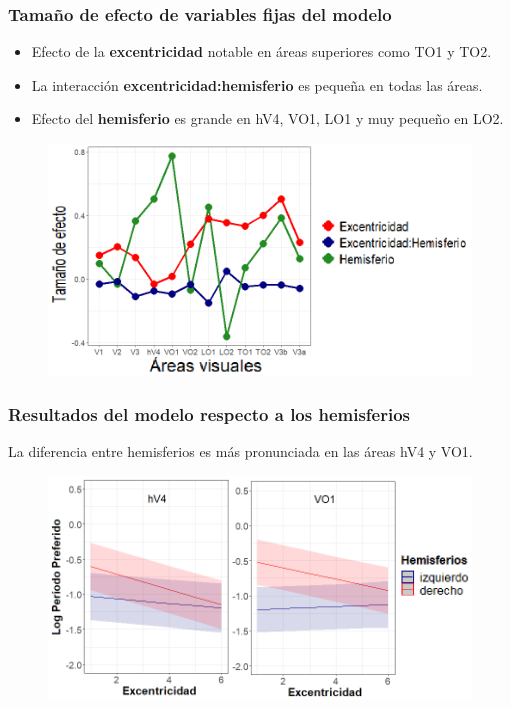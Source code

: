 \documentclass[
11pt, %
%
aspectratio=169, %
]{beamer}
\begin{document}
	\begin{frame}
		\frametitle{Tama\~no de efecto de variables fijas del modelo}	
		
			
			 \begin{itemize}
			 	\item Efecto de la \textbf{excentricidad} notable en áreas superiores como TO1 y TO2.
			 	\item La interacción \textbf{excentricidad:hemisferio} es pequeña en todas  las áreas.
			 	\item Efecto del \textbf{hemisferio} es grande en hV4, VO1, LO1 y muy pequeño en LO2.
			 \end{itemize}
		
				\begin{figure}
					\centering
					\includegraphics[scale=0.35]{Graphics/effect_size_coef_pp}
				\end{figure}				
				
		
		
	
		
		
	\end{frame}

	\begin{frame}
		\frametitle{Resultados del modelo respecto a los hemisferios}
		
		La diferencia entre hemisferios es m\'as pronunciada en las áreas hV4 y VO1.		
			
			\begin{figure}
				\centering
			 	\includegraphics[scale=0.5]{Graphics/hv4}
			\end{figure}
	
	\end{frame}
\end{document}
